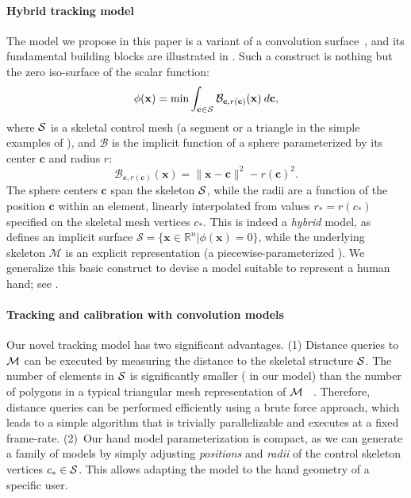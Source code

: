 

\paragraph{Hybrid tracking model}
The model we propose in this paper is a variant of a convolution surface~\cite{bloomenthal1991convolution}, and its fundamental building blocks are illustrated in . Such a construct is nothing but the zero iso-surface of the scalar function:
\begin{equation}
\phi(\mathbf{x}) = \min \int_{\mathbf{c} \in \mathcal{S}} \mathcal{B}_{\mathbf{c}, r(\mathbf{c})}(\mathbf{x}) \: d\mathbf{c},
\label{eq:convsurf}
\end{equation}
where $\mathcal{S}$ is a skeletal control mesh (a segment or a triangle in the simple examples of ), and $\mathcal{B}$ is the implicit function of a sphere parameterized by its center $\mathbf{c}$ and radius $r$:
\begin{equation}
\mathcal{B}_{\mathbf{c}, r(\mathbf{c})}(\mathbf{x}) = \|\mathbf{x}-\mathbf{c}\|^2 - r(\mathbf{c})^2.
\end{equation}
The sphere centers $\mathbf{c}$ span the skeleton $\mathcal{S}$, while the radii are a function of the position $\mathbf{c}$ within an element, linearly interpolated from values $r_*=r(c_*)$ specified on the skeletal mesh vertices $c_*$. This is indeed a \emph{hybrid} model, as  defines an implicit surface $\mathcal{S} = \{\mathbf{x} \in \mathbb{R}^n | \phi(\mathbf{x})=0 \}$, while the underlying skeleton $\mathcal{M}$ is an explicit representation (a piecewise-parameterized ). We generalize this basic construct to devise a model suitable to represent a human hand; see .


\paragraph{Tracking and calibration with convolution models}
Our novel tracking model has two significant advantages. (1) Distance queries to $\mathcal{M}$ can be executed by measuring the distance to the skeletal structure $\mathcal{S}$. The number of elements in $\mathcal{S}$ is significantly smaller ( in our model) than the number of polygons in a typical triangular mesh representation of $\mathcal{M}$~\cite{thiery2013sphere} . 
Therefore, distance queries can be performed efficiently using a brute force approach, which leads to a simple algorithm that is trivially parallelizable and executes at a fixed frame-rate. (2)~Our hand model parameterization is compact, as we can generate a family of models by simply adjusting \emph{positions} and \emph{radii} of the control skeleton vertices $c_* \in \mathcal{S}$. This allows adapting the model to the hand geometry of a specific user.

